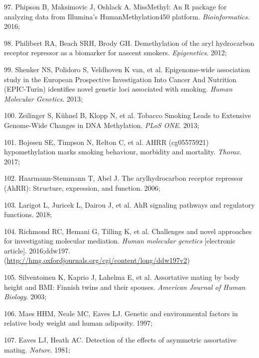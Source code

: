 \documentclass[11pt,oneside]{bristolthesis}
\newenvironment{cslreferences}%
  {}%
  {\par}
\begin{document}
\begin{cslreferences}
\leavevmode\hypertarget{ref-Phipson2016}{}%
97. Phipson B, Maksimovic J, Oshlack A. MissMethyl: An R package for analyzing data from Illumina's HumanMethylation450 platform. \emph{Bioinformatics}. 2016;

\leavevmode\hypertarget{ref-Philibert2012}{}%
98. Philibert RA, Beach SRH, Brody GH. Demethylation of the aryl hydrocarbon receptor repressor as a biomarker for nascent smokers. \emph{Epigenetics}. 2012;

\leavevmode\hypertarget{ref-Shenker2013}{}%
99. Shenker NS, Polidoro S, Veldhoven K van, et al. Epigenome-wide association study in the European Prospective Investigation Into Cancer And Nutrition (EPIC-Turin) identifies novel genetic loci associated with smoking. \emph{Human Molecular Genetics}. 2013;

\leavevmode\hypertarget{ref-Zeilinger2013}{}%
100. Zeilinger S, Kühnel B, Klopp N, et al. Tobacco Smoking Leads to Extensive Genome-Wide Changes in DNA Methylation. \emph{PLoS ONE}. 2013;

\leavevmode\hypertarget{ref-Bojesen2017}{}%
101. Bojesen SE, Timpson N, Relton C, et al. AHRR (cg05575921) hypomethylation marks smoking behaviour, morbidity and mortality. \emph{Thorax}. 2017;

\leavevmode\hypertarget{ref-Haarmann-Stemmann2006}{}%
102. Haarmann-Stemmann T, Abel J. The arylhydrocarbon receptor repressor (AhRR): Structure, expression, and function. 2006;

\leavevmode\hypertarget{ref-Larigot2018}{}%
103. Larigot L, Juricek L, Dairou J, et al. AhR signaling pathways and regulatory functions. 2018;

\leavevmode\hypertarget{ref-Richmond2016}{}%
104. Richmond RC, Hemani G, Tilling K, et al. Challenges and novel approaches for investigating molecular mediation. \emph{Human molecular genetics} {[}electronic article{]}. 2016;ddw197. (\url{http://hmg.oxfordjournals.org/cgi/content/long/ddw197v2})

\leavevmode\hypertarget{ref-Silventoinen2003}{}%
105. Silventoinen K, Kaprio J, Lahelma E, et al. Assortative mating by body height and BMI: Finnish twins and their spouses. \emph{American Journal of Human Biology}. 2003;

\leavevmode\hypertarget{ref-Maes1997}{}%
106. Maes HHM, Neale MC, Eaves LJ. Genetic and environmental factors in relative body weight and human adiposity. 1997;

\leavevmode\hypertarget{ref-Eaves1981}{}%
107. Eaves LJ, Heath AC. Detection of the effects of asymmetric assortative mating. \emph{Nature}. 1981;


\end{cslreferences}
\end{document}

